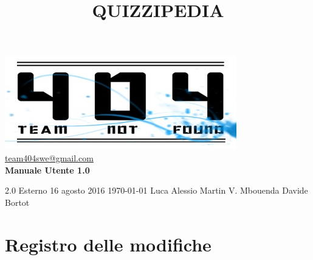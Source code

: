 \documentclass[a4paper,11pt]{article}
\title{\textbf{{\fontsize{8mm}{5mm}\selectfont QUIZZIPEDIA}}}
\date{}
\author{}
\begin{document}
	\maketitle
	\thispagestyle{empty}
	\begin{center}	
	\includegraphics{../team_not_found.jpg}\\
	\fontsize{5mm}{3mm}\url{team404swe@gmail.com}\\
	
	\vspace{50mm}
	\textbf{Manuale Utente 1.0}
	\end{center}
			{2.0} 							%
			{Esterno} 						%
			{16 agosto 2016} 				%
			{\today} 						%
			{Luca Alessio}		%
			{Martin V. Mbouenda} 			%
			{Davide Bortot} 				%
	\newpage
	\thispagestyle{empty}
	\null  

	\newpage
	\newpage
	\fancyfoot[R]{\thepage}
	
	\hspace{30 mm}
	\section*{Registro delle modifiche}
	
	\beginregistro
	
\end{document}
